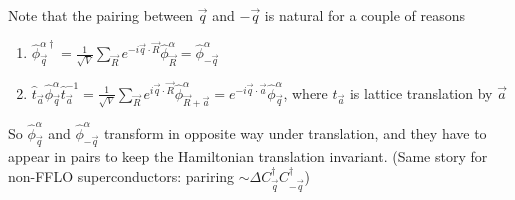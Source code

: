 Note that the pairing between $\vec{q}$ and $-\vec{q}$ is natural for a couple of reasons
\begin{enumerate}
    \item $\hat{\phi}_{\vec{q}}^{\alpha \dagger}=\frac{1}{\sqrt{V}}\sum_{\vec{R}}{e^{-i\vec{q}\cdot \vec{R}}\hat{\phi}_{\vec{R}}^{\alpha}}=\hat{\phi}_{-\vec{q}}^{\alpha}$
    \item $\hat{t}_{\vec{a}}\hat{\phi}_{\vec{q}}^{\alpha}\hat{t}_{\vec{a}}^{-1}=\frac{1}{\sqrt{V}}\sum_{\vec{R}}{e^{i\vec{q}\cdot \vec{R}}\hat{\phi}_{\vec{R}+\vec{a}}^{\alpha}}=e^{-i\vec{q}\cdot \vec{a}}\hat{\phi}_{\vec{q}}^{\alpha}$, where $\hat{t}_{\vec{a}}$ is lattice translation by $\vec{a}$
\end{enumerate}
So $\hat{\phi}_{\vec{q}}^\alpha$ and $\hat{\phi}_{-\vec{q}}^\alpha$ transform in opposite way under translation, and they have to appear in pairs to keep the Hamiltonian translation invariant. (Same story for non-FFLO superconductors: pariring $\sim\Delta C_{\vec{q}}^\dagger C_{-\vec{q}}^\dagger$)

